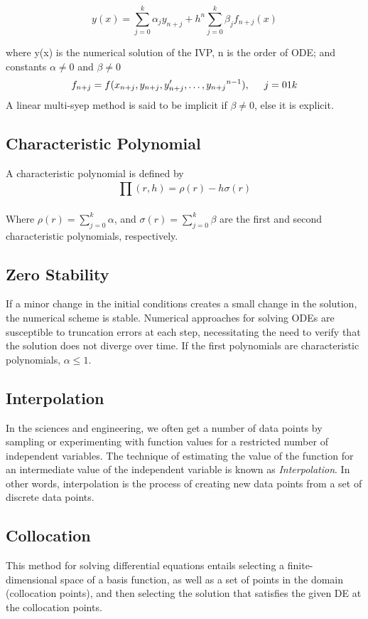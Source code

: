 \documentclass[12pt]{report}
\begin{document}
\begin{equation}
y(x) = \sum_{j=0}^{k}\alpha_jy_{n+j}+h^n\sum_{j=0}^{k}\beta_jf_{n+j}(x)
\end{equation}
	
\noindent where
y(x) is the numerical solution of the IVP, n is the order of ODE; and constants $\alpha \neq 0$ and $\beta \neq 0$ $$f_{n+j} = f(x_{n+j}, y_{n+j}, y'_{n+j}, \dots, {y_{n+j}}^{n-1}), \hspace{5mm} j=0{1}k$$
\medskip
\noindent A linear multi-syep method is said to be implicit if $\beta\neq0$, else it is explicit.
	
\subsection{Characteristic Polynomial}
A characteristic polynomial is defined by
\begin{equation}
\prod_{}^{}(r,h)=\rho(r)-h\sigma(r)
\end{equation}

	\noindent Where
$\rho(r) = \sum_{j=0}^{k} \alpha$, and  $\sigma(r) = \sum_{j=0}^{k} \beta$ are the first and second characteristic polynomials, respectively.

\subsection{Zero Stability}
If a minor change in the initial conditions creates a small change in the solution, the numerical scheme is stable. Numerical approaches for solving ODEs are susceptible to truncation errors at each step, necessitating the need to verify that the solution does not diverge over time. If the first polynomials are characteristic polynomials, $\alpha\leq1.$ 

\subsection{Interpolation}
In the sciences and engineering, we often get a number of data points by sampling or experimenting with function values for a restricted number of independent variables. The technique of estimating the value of the function for an intermediate value of the independent variable is known as \textsl{Interpolation}. In other words, interpolation is the process of creating new data points from a set of discrete data points.
\subsection{Collocation}
This method for solving differential equations entails selecting a finite-dimensional space of a basis function, as well as a set of points in the domain (collocation points), and then selecting the solution that satisfies the given DE at the collocation points.
\end{document}
